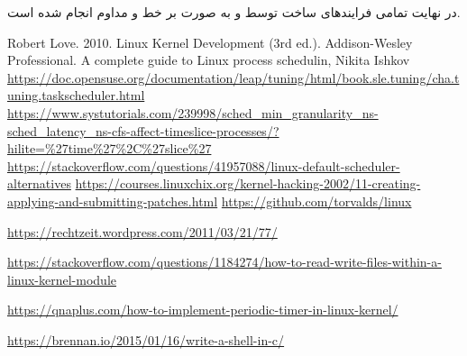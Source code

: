 \documentclass{article}
\begin{document}
در نهایت تمامی فرایند‌های ساخت توسط  و به صورت بر خط و مداوم انجام شده است.

\begin{thebibliography}{9}

\latin
{}
Robert Love. 2010. Linux Kernel Development (3rd ed.). Addison-Wesley Professional.
A complete guide to Linux process schedulin, Nikita Ishkov
\url{https://doc.opensuse.org/documentation/leap/tuning/html/book.sle.tuning/cha.tuning.taskscheduler.html}
\url{https://www.systutorials.com/239998/sched_min_granularity_ns-sched_latency_ns-cfs-affect-timeslice-processes/?hilite=%27time%27%2C%27slice%27}
\url{https://stackoverflow.com/questions/41957088/linux-default-scheduler-alternatives}
\url{https://courses.linuxchix.org/kernel-hacking-2002/11-creating-applying-and-submitting-patches.html}
\url{https://github.com/torvalds/linux}

\url{https://rechtzeit.wordpress.com/2011/03/21/77/}

\url{https://stackoverflow.com/questions/1184274/how-to-read-write-files-within-a-linux-kernel-module}

\url{https://qnaplus.com/how-to-implement-periodic-timer-in-linux-kernel/}

\url{https://brennan.io/2015/01/16/write-a-shell-in-c/}
\end{thebibliography}
\end{document}

